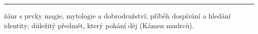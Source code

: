 \documentclass[FGBook.tex]{subfiles}
\begin{document}
\vfill

\noindent\begin{minipage}{\textwidth}
    {\textcolor{\wpagecolor}{\rule{\linewidth}{0.4pt}}
    \footnotesize
     žánr s prvky magie, mytologie a dobrodružství; 
     příběh dospívání a hledání identity; 
     důležitý předmět, který pohání děj (Kámen mudrců).
    }
\end{minipage}

\newpage
\end{document}
